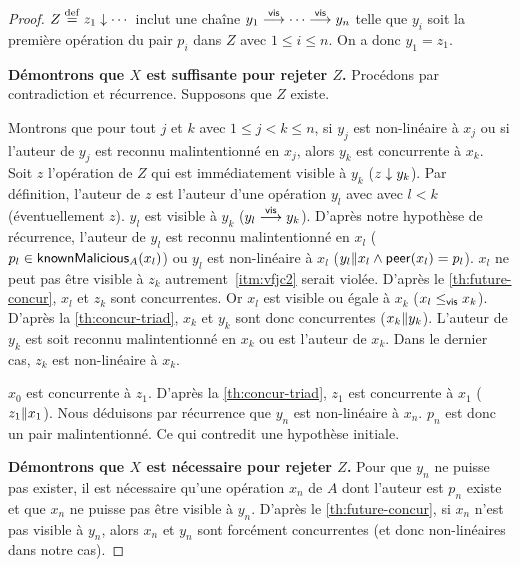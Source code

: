 \begin{proof}
$Z \overset{\mathrm{def}}{=} z_1 \downarrow \dotsb$ inclut une chaîne $y_1 \overset{\mathsf{vis}}{\longrightarrow} \dotsb \overset{\mathsf{vis}}{\longrightarrow} y_n$ telle que $y_i$ soit la première opération du pair $p_i$ dans $Z$ avec $1 \leq i \leq n$.
On a donc $y_1 = z_1$.

\textbf{Démontrons que $X$ est suffisante pour rejeter $Z$.}
Procédons par contradiction et récurrence.
Supposons que $Z$ existe.

Montrons que pour tout $j$ et $k$ avec $1 \leq j < k \leq n$, si $y_j$ est non-linéaire à $x_j$ ou si l'auteur de $y_j$ est reconnu malintentionné en $x_j$, alors $y_k$ est concurrente à $x_k$.
Soit $z$ l'opération de $Z$ qui est immédiatement visible à $y_k$ ($z \downarrow y_k$).
Par définition, l'auteur de $z$ est l'auteur d'une opération $y_l$ avec avec $l < k$ (éventuellement $z$).
$y_l$ est visible à $y_k$ ($y_l \overset{\mathsf{vis}}{\longrightarrow} y_k$).
D'après notre hypothèse de récurrence, l'auteur de $y_l$ est reconnu malintentionné en $x_l$ ($p_l \in \operatorname{\mathsf{knownMalicious}}_A(x_l)$) ou $y_l$ est non-linéaire à $x_l$ ($y_l \| x_l \land \operatorname{\mathsf{peer}}(x_l) = p_l$).
$x_l$ ne peut pas être visible à $z_k$ autrement~\ref{itm:vfjc2} serait violée.
D'après le \autoref{th:future-concur}, $x_l$ et $z_k$ sont concurrentes.
Or $x_l$ est visible ou égale à $x_k$ ($x_l \leq_{\operatorname{\mathsf{vis}}} x_k$).
D'après la \autoref{th:concur-triad}, $x_k$ et $y_k$ sont donc concurrentes ($x_k \| y_k$).
L'auteur de $y_k$ est soit reconnu malintentionné en $x_k$ ou est l'auteur de $x_k$.
Dans le dernier cas, $z_k$ est non-linéaire à $x_k$.

$x_0$ est concurrente à $z_1$.
D'après la \autoref{th:concur-triad}, $z_1$ est concurrente à $x_1$ ($z_1 \| x_1$).
Nous déduisons par récurrence que $y_n$ est non-linéaire à $x_n$.
$p_n$ est donc un pair malintentionné.
Ce qui contredit une hypothèse initiale.

%

\textbf{Démontrons que $X$ est nécessaire pour rejeter $Z$.}
Pour que $y_n$ ne puisse pas exister, il est nécessaire qu'une opération $x_n$ de $A$ dont l'auteur est $p_n$ existe et que $x_n$ ne puisse pas être visible à $y_n$.
D'après le \autoref{th:future-concur}, si $x_n$ n'est pas visible à $y_n$, alors $x_n$ et $y_n$ sont forcément concurrentes (et donc non-linéaires dans notre cas).


\end{proof}
